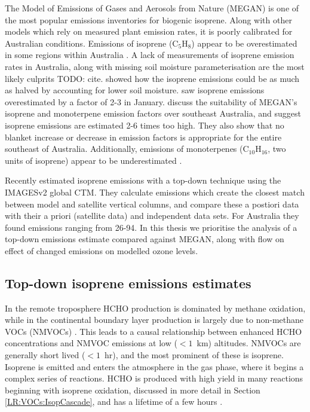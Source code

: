     The Model of Emissions of Gases and Aerosols from Nature (MEGAN) is one of the most popular emissions inventories for biogenic isoprene.
    Along with other models which rely on measured plant emission rates, it is poorly calibrated for Australian conditions.
    Emissions of isoprene (C$_5$H$_8$) appear to be overestimated in some regions within Australia \parencite{Sindelarova2014,Stavrakou2014,Emmerson2016}.
    A lack of measurements of isoprene emission rates in Australia, along with missing soil moisture parameterisation are the most likely culprits TODO: cite.
    \textcite{Sindelarova2014} showed how the isoprene emissions could be as much as halved by accounting for lower soil moisture.
    \textcite{Stavrakou2015} saw isoprene emissions overestimated by a factor of 2-3 in January.
    \textcite{Emmerson2016} discuss the suitability of MEGAN's isoprene and monoterpene emission factors over southeast Australia, and suggest isoprene emissions are estimated 2-6 times too high.
    They also show that no blanket increase or decrease in emission factors is appropriate for the entire southeast of Australia.
    Additionally, emissions of monoterpenes (C$_{10}$H$_{16}$, two units of isoprene) appear to be underestimated \parencite{Emmerson2016}.
    
    Recently \textcite{Bauwens2016} estimated isoprene emissions with a top-down technique using the IMAGESv2 global CTM.
    They calculate emissions which create the closest match between model and satellite vertical columns, and compare these a postiori data with their a priori (satellite data) and independent data sets.
    For Australia they found emissions ranging from 26-94\tgcpyr.
    In this thesis we prioritise the analysis of a top-down emissions estimate compared against MEGAN, along with flow on effect of changed emissions on modelled ozone levels.
  
  
  \subsection{Top-down isoprene emissions estimates}
    \label{BioIsop:intro:top_down_estimates}
    
    In the remote troposphere HCHO production is dominated by methane oxidation, while in the continental boundary layer production is largely due to non-methane VOCs (NMVOCs) \parencite{Abbot2003, Kefauver2014}.
    This leads to a causal relationship between enhanced HCHO concentrations and NMVOC emissions at low ($<1$~km) altitudes.
    NMVOCs are generally short lived ($<1$~hr), and the most prominent of these is isoprene.
    Isoprene is emitted and enters the atmosphere in the gas phase, where it begins a complex series of reactions.
    HCHO is produced with high yield in many reactions beginning with isoprene oxidation, discussed in more detail in Section \ref{LR:VOCs:IsopCascade}, and has a lifetime of a few hours \parencite{Kefauver2014}.
    
